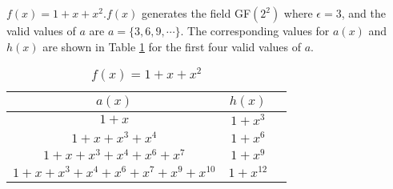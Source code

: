 \begin{example}
$f(x)=1+x+x^2$.\newline $f(x)$ generates the field GF$(2^2)$ where $\epsilon=3$, and the  valid values of $a$ are $a=\{3,6,9,\cdots \}$. The corresponding values for $a(x)$ and $h(x)$ are shown in Table \ref{novelTab2} for the first four valid values of $a$.
\begin{table}[htbp]
 \caption{$f(x)=1+x+x^2$}
\centering
 \begin{tabular}{c c c} 
 $a(x)$ & $h(x)$ \\ [0.5ex] 
 \hline\hline
$1+x$
 & $1+x^{3}$ \\
\hline
$1+x+x^3+x^4$
 & $1+x^{6}$ 
 \\
\hline
$1+x+x^3+x^4+x^6+x^{7}$ 
&  $1+x^{9}$ 
\\
\hline
$1+x+x^3+x^4+x^6+x^{7}+x^9+x^{10}$
 &  $1+x^{12}$ \\
 \end{tabular}
 \label{novelTab2}
\end{table}
\label{ex-2}
\end{example}

